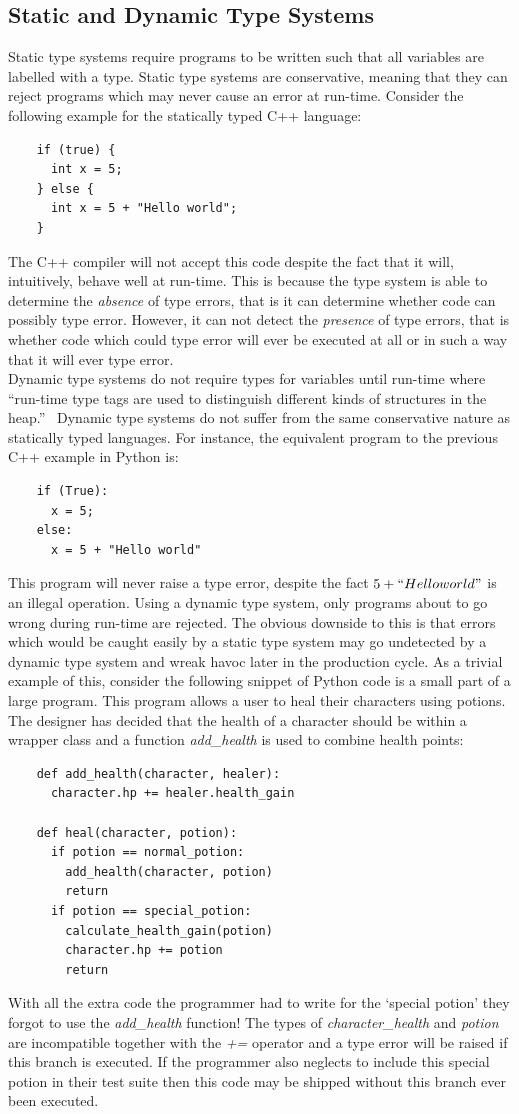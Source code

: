 \documentclass[12pt, titlepage]{article}
\begin{document}
\subsection{Static and Dynamic Type Systems}
Static type systems require programs to be written such that all variables are labelled with a type. Static type systems are conservative, meaning that they can reject programs which may never cause an error at run-time. Consider the following example for the statically typed C++ language:
\begin{lstlisting}
	if (true) {	
	  int x = 5;
	} else {
	  int x = 5 + "Hello world";
	}
\end{lstlisting}
The C++ compiler will not accept this code despite the fact that it will, intuitively, behave well at run-time. This is because the type system is able to determine the \textit{absence} of type errors, that is it can determine whether code can possibly type error. However, it can not detect the \textit{presence} of type errors, that is whether code which could type error will ever be executed at all or in such a way that it will ever type error. \\
Dynamic type systems do not require types for variables until run-time where ``run-time type tags are used to distinguish different kinds of structures in the heap.''~\cite{pierce02} Dynamic type systems do not suffer from the same conservative nature as statically typed languages. For instance, the equivalent program to the previous C++ example in Python is:
\begin{lstlisting}
	if (True):	
	  x = 5;
	else:
	  x = 5 + "Hello world"
\end{lstlisting}
This program will never raise a type error, despite the fact $5 + ``Hello  world"$ is an illegal operation. Using a dynamic type system, only programs about to go wrong during run-time are rejected. The obvious downside to this is that errors which would be caught easily by a static type system may go undetected by a dynamic type system and wreak havoc later in the production cycle. As a trivial example of this, consider the following snippet of Python code is a small part of a large program. This program allows a user to heal their characters using potions. The designer has decided that the health of a character should be within a wrapper class and a function \textit{add\_health} is used to combine health points:
\begin{lstlisting}
	def add_health(character, healer):
	  character.hp += healer.health_gain	

	def heal(character, potion):
	  if potion == normal_potion:
	    add_health(character, potion)
	    return
	  if potion == special_potion:
	    calculate_health_gain(potion)
	    character.hp += potion		
	    return
\end{lstlisting}
With all the extra code the programmer had to write for the `special potion' they forgot to use the \textit{add\_health} function! The types of \textit{character\_health} and \textit{potion} are incompatible together with the \textit{+=} operator and a type error will be raised if this branch is executed. If the programmer also neglects to include this special potion in their test suite then this code may be shipped without this branch ever been executed.
\end{document}
